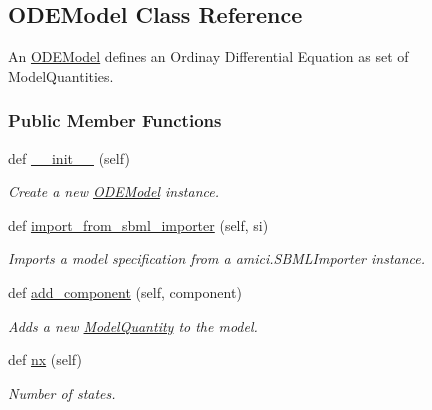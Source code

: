 \hypertarget{classamici_1_1ode__export_1_1_o_d_e_model}{}\subsection{O\+D\+E\+Model Class Reference}
\label{classamici_1_1ode__export_1_1_o_d_e_model}


An \mbox{\hyperlink{classamici_1_1ode__export_1_1_o_d_e_model}{O\+D\+E\+Model}} defines an Ordinay Differential Equation as set of Model\+Quantities.  


\subsubsection*{Public Member Functions}
\begin{DoxyCompactItemize}
\item 
def \mbox{\hyperlink{classamici_1_1ode__export_1_1_o_d_e_model_ae64f0875afe3067b97ba370b354b9213}{\+\_\+\+\_\+init\+\_\+\+\_\+}} (self)
\begin{DoxyCompactList}\small\item\em Create a new \mbox{\hyperlink{classamici_1_1ode__export_1_1_o_d_e_model}{O\+D\+E\+Model}} instance. \end{DoxyCompactList}\item 
def \mbox{\hyperlink{classamici_1_1ode__export_1_1_o_d_e_model_a3a3ebfdaf0d1f08adf028afb10d5b5c1}{import\+\_\+from\+\_\+sbml\+\_\+importer}} (self, si)
\begin{DoxyCompactList}\small\item\em Imports a model specification from a amici.\+S\+B\+M\+L\+Importer instance. \end{DoxyCompactList}\item 
def \mbox{\hyperlink{classamici_1_1ode__export_1_1_o_d_e_model_a2731bd07d8e64b54d6b455d6d8441f13}{add\+\_\+component}} (self, component)
\begin{DoxyCompactList}\small\item\em Adds a new \mbox{\hyperlink{classamici_1_1ode__export_1_1_model_quantity}{Model\+Quantity}} to the model. \end{DoxyCompactList}\item 
def \mbox{\hyperlink{classamici_1_1ode__export_1_1_o_d_e_model_a43830bc0d4337068016ab3f290e3cdca}{nx}} (self)
\begin{DoxyCompactList}\small\item\em Number of states. \end{DoxyCompactList}\item 

\end{DoxyCompactItemize}
